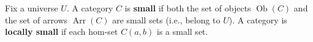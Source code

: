 Fix a universe $U$. A category $C$ is \textbf{small} if both the set of objects $\operatorname{Ob}(C)$ and the set of arrows $\operatorname{Arr}(C)$ are small sets (i.e., belong to $U$). A category is \textbf{locally small} if each hom-set $C(a,b)$ is a small set.